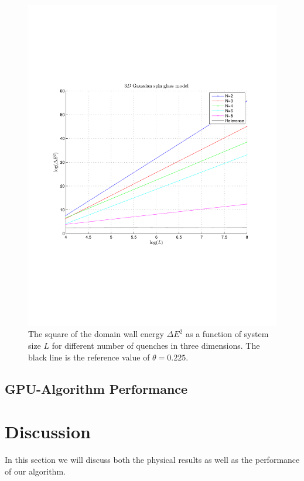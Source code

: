 \documentclass[paper=a4, fontsize=11pt]{scrartcl} %
\numberwithin{equation}{section} %
\numberwithin{figure}{section} %
\numberwithin{table}{section} %
\begin{document}
\begin{figure}
\centering
\includegraphics[width=\textwidth]{images/spinglass3D_small.pdf}
\caption{The square of the domain wall energy $\Delta E ^ 2$ as a function of system size $L$ for different number of quenches in three dimensions. The black line is the reference value of $\theta=0.225$.}
\label{fig:E_3D_small}
\end{figure}

\subsection{GPU-Algorithm Performance}

\section{Discussion}
\label{sec:discussion}
In this section we will discuss both the physical results as well as the performance of our algorithm.
\end{document}
